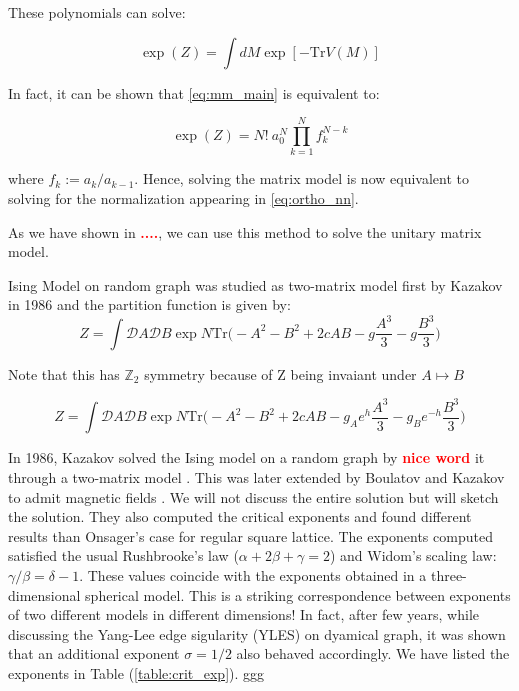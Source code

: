 \documentclass[11pt]{article}
\newcommand{\TODO}[1]{\textcolor{red}{{\bf #1}}}
\begin{document}
These polynomials can solve:

\begin{equation}
	\label{eq:mm_main}
	\exp(Z) = \int dM \exp[-\mbox{Tr} V(M)] 
\end{equation}

In fact, it can be shown that \ref{eq:mm_main} is equivalent to:

\begin{equation}
	\exp(Z) = N! ~ a_{0}^{N} \prod_{k=1}^{N} f_{k}^{N-k}
\end{equation}

where $f_{k} := a_{k}/a_{k-1}$. Hence, solving the matrix model is now equivalent to solving for the normalization appearing in \ref{eq:ortho_nn}. 

As we have shown in \TODO{....}, we can use this method to solve the unitary matrix model.


Ising Model on random graph was studied as two-matrix model first by Kazakov in 1986 and the partition function is given by:
\begin{equation}
	\label{eq:Kaz1} 
	Z = \int \mathcal{D}A \mathcal{D}B \exp N \mbox{Tr} \Bigg(-A^2 -B^2 + 2c AB -g \frac{A^3}{3} - g\frac{B^3}{3}  \Bigg)
\end{equation}

Note that this has $\mathbb{Z}_{2}$ symmetry because of 
Z being invaiant under $A \mapsto B$



\begin{equation}
	\label{eq:RIsing1} 
	Z = \int \mathcal{D}A \mathcal{D}B \exp N \mbox{Tr} \Bigg(-A^2 -B^2 + 2c AB -g_{A}e^{h} \frac{A^3}{3} 
	- g_{B}e^{-h} \frac{B^3}{3}  \Bigg)
\end{equation}

In 1986, Kazakov solved the Ising model on a random graph by \TODO{nice word} it through a two-matrix model \cite{Kazakov:1986hy}. This was later extended by Boulatov and Kazakov to admit magnetic fields \cite{Boulatov:1986sb}. We will not discuss the entire solution but will sketch the solution. They also computed the critical exponents and found different results than Onsager's case for regular square lattice. 
The exponents computed satisfied the usual Rushbrooke's law ($\alpha + 2\beta+\gamma=2$) and Widom's scaling law: $\gamma/\beta = \delta -1$. These values coincide with the  exponents obtained in a three-dimensional spherical model. This is a striking correspondence between exponents of two different models in different dimensions! In fact, after few years, while discussing the Yang-Lee edge sigularity (YLES) on dyamical graph, it was shown that an additional exponent $\sigma =1/2$ also behaved accordingly. We have listed the exponents in Table (\ref{table:crit_exp}). ggg
\end{document}
